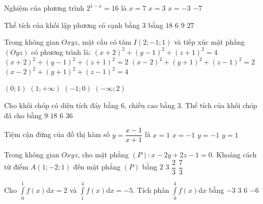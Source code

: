 \begin{ex}%
Nghiệm của phương trình $2^{1-x}=16$ là
\choice
{$x=7$}
{$x=3$}
{\True $x=-3$}
{$-7$}

\end{ex}
\begin{ex}%
Thể tích của khối lập phương có cạnh bằng $3$ bằng
\choice
{$18$}
{$6$}
{$9$}
{\True $27$}

\end{ex}
\begin{ex}%
Trong không gian $O x y z$, mặt cầu có tâm $I(2;-1; 1)$ và tiếp xúc mặt phẳng $(O y z)$ có phương trình là:
\choice
{$(x+2)^2+(y-1)^2+(z+1)^2=4$}
{$(x+2)^2+(y-1)^2+(z+1)^2=2$}
{$(x-2)^2+(y+1)^2+(z-1)^2=2$}
{\True $(x-2)^2+(y+1)^2+(z-1)^2=4$}

\end{ex}
\begin{ex}%
{\vspace{-0.4cm}
}
\choice
{\True $(0;1)$}
{$(1;+\infty)$}
{$(-1;0)$}
{$(-\infty;2)$}
\end{ex}
\begin{ex}%
Cho khối chóp có diện tích đáy bằng $6$, chiều cao bằng $3$. Thể tích của khối chóp đã cho bằng
\choice
{$9$}
{$18$}
{\True $6$}
{$36$}

\end{ex}
\begin{ex}%
Tiệm cận đứng của đồ thị hàm số $y=\dfrac{x-1}{x+1}$ là
\choice
{$x=1$}
{\True $x=-1$}
{$y=-1$}
{$y=1$}

\end{ex}
\begin{ex}%
Trong không gian $O x y z$, cho mặt phẳng $(P)\colon x-2 y+2 z-1=0$. Khoảng cách từ điểm $A(1;-2; 1)$ đến mặt phẳng $(P)$ bằng
\choice
{\True $2$}
{$3$}
{$\dfrac{2}{3}$}
{$\dfrac{7}{3}$}

\end{ex}
\begin{ex}%
Cho $\displaystyle\int\limits_0^1 f(x) \mathrm{d} x=2$ và $\displaystyle\int\limits_1^4  f(x) \mathrm{d} x=-5$. Tích phân $\displaystyle\int\limits_0^4 f(x) \mathrm{d} x$ 
bằng 
\choice
{$-3$}
{$3$}
{ $6$} 
{\True $-6$}


\end{ex}
